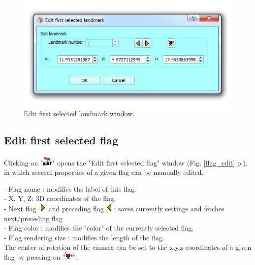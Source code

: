 \begin{figure}
  \centering
  \includegraphics[scale=0.55]{images/06/objects/edit_landmark.png} 
	\caption{Edit first selected landmark window.}
\label{landmark_edit}
 
\end{figure}

\subsection{Edit first selected flag}
Clicking on "\includegraphics[scale=0.7]{images/06/objects/flag_edit.png}" opens the "Edit first selected flag" window (Fig. \ref{flag_edit} p.\pageref{flag_edit}), in which several properties of a given flag can be manually edited.

- Flag name : modifies the label of this flag.\\
- X, Y, Z: 3D coordinates of the flag.\\
- Next flag \includegraphics[scale=0.7]{images/06/objects/s_right.png} and preceding flag \includegraphics[scale=0.7]{images/06/objects/s_left.png}: saves currently  settings and fetches next/preceding flag\\
- Flag color : modifies the "color" of the currently selected flag.\\
- Flag rendering size : modifies the length of the flag.\\
The center of rotation of the camera can be set to the x,y,z coordinates of a given flag by pressing on "\includegraphics[scale=0.7]{images/06/objects/move_cam3.png}".


